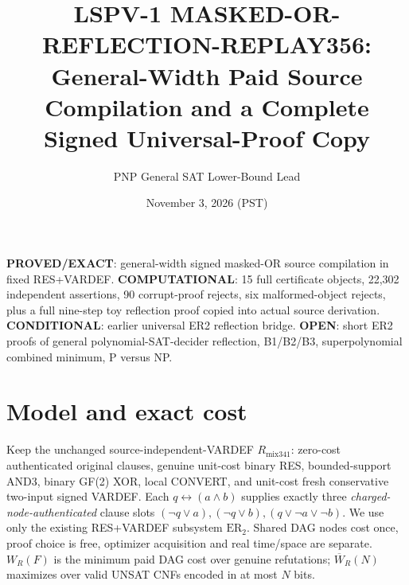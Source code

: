 \documentclass[11pt]{article}
\title{LSPV-1 MASKED-OR-REFLECTION-REPLAY356: General-Width Paid Source Compilation and a Complete Signed Universal-Proof Copy}
\author{PNP General SAT Lower-Bound Lead}
\date{November 3, 2026 (PST)}
\begin{document}
\maketitle
\noindent\textbf{PROVED/EXACT}: general-width signed masked-OR source compilation in fixed RES+VARDEF. \textbf{COMPUTATIONAL}: 15 full certificate objects, 22,302 independent assertions, 90 corrupt-proof rejects, six malformed-object rejects, plus a full nine-step toy reflection proof copied into actual source derivation. \textbf{CONDITIONAL}: earlier universal ER2 reflection bridge. \textbf{OPEN}: short ER2 proofs of general polynomial-SAT-decider reflection, B1/B2/B3, superpolynomial combined minimum, P versus NP.

\section*{Model and exact cost}
Keep the unchanged source-independent-VARDEF \(R_{\mathrm{mix341}}\): zero-cost authenticated original clauses, genuine unit-cost binary RES, bounded-support AND3, binary GF(2) XOR, local CONVERT, and unit-cost fresh conservative two-input signed VARDEF. Each \(q\leftrightarrow(a\wedge b)\) supplies exactly three \emph{charged-node-authenticated} clause slots \((\neg q\vee a),(\neg q\vee b),(q\vee\neg a\vee\neg b)\). We use only the existing RES+VARDEF subsystem \(\mathrm{ER}_2\). Shared DAG nodes cost once, proof choice is free, optimizer acquisition and real time/space are separate. \(W_R(F)\) is the minimum paid DAG cost over genuine refutations; \(\overline W_R(N)\) maximizes over valid UNSAT CNFs encoded in at most \(N\) bits.
\end{document}
